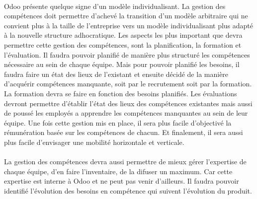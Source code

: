 \paragraph{} Odoo présente quelque signe d'un modèle individualisant. La gestion des compétences doit permettre d'achevé la transition d'un modèle arbitraire qui ne convient plus à la taille de l'entreprise vers un modèle individualisant plus adapté à la nouvelle structure adhocratique. Les aspects les plus important que devra permettre cette gestion des compétences, sont la planification, la formation et l'évaluation. Il faudra pouvoir planifié de manière plus structuré les compétences nécessaire au sein de chaque équipe. Mais pour pouvoir planifié les besoins, il faudra faire un état des lieux de l'existant et ensuite décidé de la manière d'acquérir compétences manquante, soit par le recrutement soit par la formation. La formation devra se faire en fonction des besoins planifiés. Les évaluations devront permettre d'établir l'état des lieux des compétences existantes mais aussi de poussé les employés a apprendre les compétences manquantes au sein de leur équipe. Une fois cette gestion mis en place, il sera plus facile d'objectivé la rémunération basée sur les compétences de chacun. Et finalement, il sera aussi plus facile d'envisager une mobilité horizontale et verticale.

\paragraph{} La gestion des compétences devra aussi permettre de mieux gérer l'expertise de chaque équipe, d'en faire l'inventaire, de la difuser un maximum. Car cette expertise est interne à Odoo et ne peut pas venir d'ailleurs. Il faudra pouvoir identifié l'évolution des besoins en compétence qui suivent l'évolution du produit.



